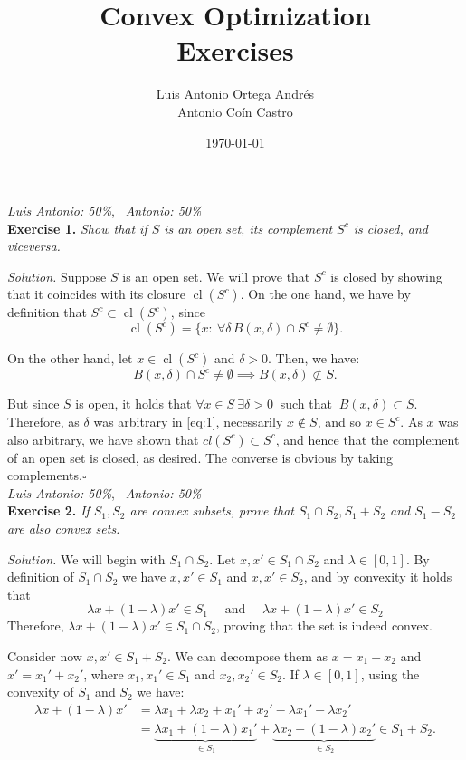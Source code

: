 \documentclass[12pt]{article}
\author{Luis Antonio Ortega Andrés\\Antonio Coín Castro}
\date{\today}
\title{Convex Optimization \\ \Large Exercises}
\newcommand*{\QED}{\null\nobreak\hfill\ensuremath{\square}}%
\begin{document}
\maketitle


\textit{Luis Antonio: 50\%}, \ \textit{Antonio: 50\%}\\
\textbf{Exercise 1. }\emph{Show that if \( S \) is an open set, its complement \( S^c \) is closed, and viceversa.}

\emph{Solution.} Suppose $S$ is an open set. We will prove that $S^c$ is closed by showing that it coincides with its closure $\operatorname{cl}(S^c)$. On the one hand, we have by definition that \( S^c \subset \operatorname{cl}({S^c})\), since
\[
     \operatorname{cl}(S^c) =  \{x : \ \forall \delta\,  B(x, \delta) \cap S^c \neq \emptyset \}.
\]

On the other hand, let \( x \in \operatorname{cl}({S^c}) \) and $\delta>0$. Then, we have:
\begin{equation}
  \label{eq:1}
     B(x, \delta) \cap S^c \neq \emptyset \implies B(x, \delta) \not \subset S.
\end{equation}

But since \( S \) is open, it holds that \( \forall x \in S \ \exists \delta > 0 \ \)  such that \( \ B(x, \delta) \subset S\). Therefore, as $\delta$ was arbitrary in \eqref{eq:1}, necessarily $x\notin S$, and so $x\in S^c$.  As $x$ was also arbitrary, we have shown that $cl(S^c)\subset S^c$, and hence that the complement of an open set is closed, as desired. The converse is obvious by taking complements.\QED\\

\textit{Luis Antonio: 50\%}, \ \textit{Antonio: 50\%}\\
\textbf{Exercise 2. }\emph{If \( S_1, S_2 \) are convex subsets, prove that \( S_1 \cap S_2, S_1 + S_2 \) and \( S_1 - S_2 \) are also convex sets.}

\emph{Solution.} We will begin with \( S_1 \cap S_2 \). Let \( x, x' \in S_1 \cap S_2 \) and \( \lambda \in [0,1] \). By definition of $S_1\cap S_2$ we have $x,x'\in S_1$ and $x,x'\in S_2$, and by convexity it holds that
\[
     \lambda x + (1-\lambda)x' \in S_1 \quad \text{ and } \quad  \lambda x + (1-\lambda)x' \in S_2
\]
Therefore, \(  \lambda x + (1-\lambda)x' \in S_1 \cap S_2 \), proving that the set is indeed convex.

Consider now \( x, x' \in S_1 + S_2 \). We can decompose them as \(x = x_1 + x_2 \) and \( x' = x_1' + x_2' \), where $x_1, x_1'\in S_1$ and $x_2, x_2'\in S_2$. If $\lambda\in[0,1]$, using the convexity of $S_1$ and $S_2$ we have:
\begin{align*}
   \lambda x + (1-\lambda)x' &= \lambda x_1 + \lambda x_2 + x_1' + x_2' - \lambda x_1' - \lambda x_2'\\
   &= \underbrace{\lambda x_1 + (1-\lambda) x_1'}_{\in S_1} + \underbrace{\lambda x_2 + (1-\lambda) x_2'}_{\in S_2} \in S_1 + S_2.
\end{align*}
\end{document}
